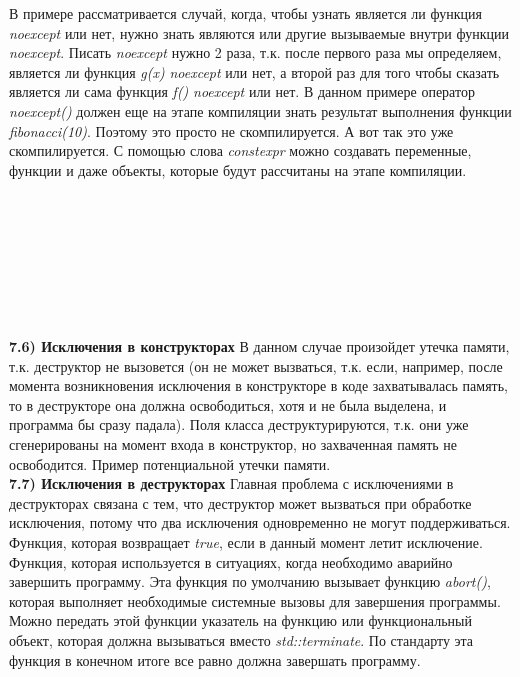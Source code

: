 \documentclass{article}
\begin{document}
В примере рассматривается случай, когда, чтобы узнать является ли функция \textit{noexcept} или нет, нужно знать являются или другие вызываемые внутри функции \textit{noexcept}. Писать \textit{noexcept} нужно 2 раза, т.к. после первого раза мы определяем, является ли функция \textit{g(x)} \textit{noexcept} или нет, а второй раз для того чтобы сказать является ли сама функция \textit{f()} \textit{noexcept} или нет.
В данном примере оператор \textit{noexcept()} должен еще на этапе компиляции знать результат выполнения функции \textit{fibonacci(10)}. Поэтому это просто не скомпилируется.
А вот так это уже скомпилируется. С помощью слова \textit{constexpr} можно создавать переменные, функции и даже объекты, которые будут рассчитаны на этапе компиляции.\\\\\\\\\\\\\\\\\\
\noindent \textbf{7.6) Исключения в конструкторах}
В данном случае произойдет утечка памяти, т.к. деструктор не вызовется (он не может вызваться, т.к. если, например, после момента возникновения исключения в конструкторе в коде захватывалась память, то в деструкторе она должна освободиться, хотя и не была выделена, и программа бы сразу падала). Поля класса деструктурируются, т.к. они уже сгенерированы на момент входа в конструктор, но захваченная память не освободится.
Пример потенциальной утечки памяти.\\
\noindent \textbf{7.7) Исключения в деструкторах}
Главная проблема с исключениями в деструкторах связана с тем, что деструктор может вызваться при обработке исключения, потому что два исключения одновременно не могут поддерживаться. 
Функция, которая возвращает \textit{true}, если в данный момент летит исключение.\\
Функция, которая используется в ситуациях, когда необходимо аварийно завершить программу. Эта функция по умолчанию вызывает функцию \textit{abort()}, которая выполняет необходимые системные вызовы для завершения программы.
Можно передать этой функции указатель на функцию или функциональный объект, которая должна вызываться вместо \textit{std::terminate}. По стандарту эта функция в конечном итоге все равно должна завершать программу. \\
\end{document}
